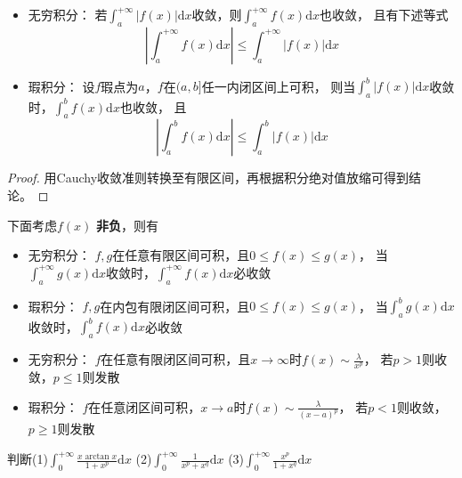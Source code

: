 \begin{theorem}[绝对收敛]
  \begin{itemize}
  \item 无穷积分：
    若$\int_a^{+\infty}|f(x)|\mathrm{d}x$收敛，则$\int^{+\infty}_af(x)\mathrm{d}x$也收敛，
    且有下述等式
    \begin{equation*}
      |\int_a^{+\infty}f(x)\mathrm{d}x| \leq \int^{+\infty}_a |f(x)|\mathrm{d}x
    \end{equation*}
  \item 瑕积分：
    设$f$瑕点为$a$，$f$在$(a,b]$任一内闭区间上可积，
    则当$\int_a^b|f(x)|\mathrm{d}x$收敛时，$\int_a^bf(x)\mathrm{d}x$也收敛，
    且
    \begin{equation*}
      |\int_a^b f(x)\mathrm{d}x| \leq \int_a^b |f(x)|\mathrm{d}x
    \end{equation*}
  \end{itemize}
\end{theorem}

\begin{proof}
  用Cauchy收敛准则转换至有限区间，再根据积分绝对值放缩可得到结论。
\end{proof}

\begin{theorem}[比较判别法]
  下面考虑$f(x)$ \textbf{非负}，则有
  \begin{itemize}
  \item 无穷积分：
    $f,g$在任意有限区间可积，且$0 \leq f(x) \leq g(x)$，
    当$\int_a^{+\infty}g(x)\mathrm{d}x$收敛时，$\int^{+\infty}_af(x)\mathrm{d}x$必收敛
  \item 瑕积分：
    $f,g$在内包有限闭区间可积，且$0 \leq f(x) \leq g(x)$，
    当$\int_a^bg(x)\mathrm{d}x$收敛时，$\int^b_af(x)\mathrm{d}x$必收敛
  \end{itemize}
\end{theorem}

\begin{corollary}[等价无穷小判别]
  \begin{itemize}
  \item 无穷积分：
    $f$在任意有限闭区间可积，且$x \rightarrow \infty$时$f(x) \sim \frac{\lambda}{x^p}$，
    若$p > 1$则收敛，$p \leq 1$则发散
  \item 瑕积分：
    $f$在任意闭区间可积，$x \rightarrow a$时$f(x) \sim \frac{\lambda}{(x - a)^p}$，
    若$p < 1$则收敛，$p \geq 1$则发散
  \end{itemize}
\end{corollary}

\begin{exercise}[基础训练]
  判断(1)$\int_0^{+\infty}\frac{x \arctan x}{1 + x^p}\mathrm{d}x$
  (2)$\int_0^{+\infty}\frac{1}{x^p + x^q}\mathrm{d} x$
  (3)$\int_0^{+\infty}\frac{x^p}{1 + x^q}\mathrm{d}x$
\end{exercise}

